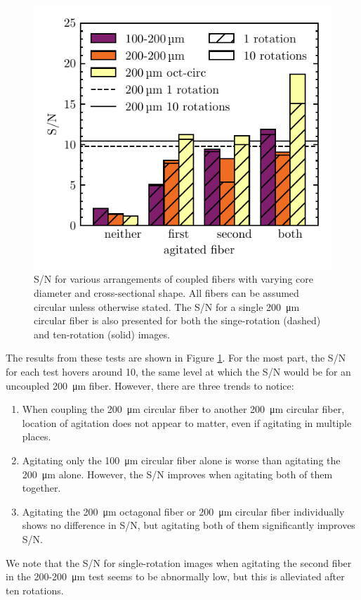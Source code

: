 \documentclass[twocolumn]{emulateapj}
\begin{document}
\begin{figure}
\centering
	\includegraphics[width=\columnwidth]{coupled_fibers.pdf}
	\caption{S/N for various arrangements of coupled fibers with varying core diameter and cross-sectional shape. All fibers can be assumed circular unless otherwise stated. The S/N for a single \SI{200}{\micro\meter} circular fiber is also presented for both the singe-rotation (dashed) and ten-rotation (solid) images.}
\label{fig:coupled_fibers}
\end{figure}

The results from these tests are shown in Figure \ref{fig:coupled_fibers}. For the most part, the S/N for each test hovers around 10, the same level at which the S/N would be for an uncoupled \SI{200}{\micro\meter} fiber. However, there are three trends to notice:
\begin{enumerate}
\item When coupling the \SI{200}{\micro\meter} circular fiber to another \SI{200}{\micro\meter} circular fiber, location of agitation does not appear to matter, even if agitating in multiple places.
\item Agitating only the \SI{100}{\micro\meter} circular fiber alone is worse than agitating the \SI{200}{\micro\meter} alone. However, the S/N improves when agitating both of them together.
\item Agitating the \SI{200}{\micro\meter} octagonal fiber or \SI{200}{\micro\meter} circular fiber individually shows no difference in S/N, but agitating both of them significantly improves S/N.
\end{enumerate}
We note that the S/N for single-rotation images when agitating the second fiber in the 200-\SI{200}{\micro\meter} test seems to be abnormally low, but this is alleviated after ten rotations.
\end{document}
